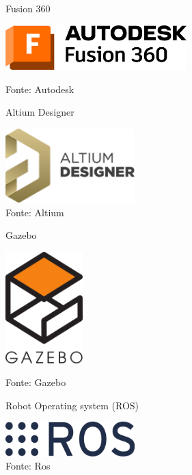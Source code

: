 \documentclass[../poliXuniversity_hospital_(USP)_report.tex]{subfiles}
\begin{document}
\begin{figure}[h]
\centering
    \begin{minipage}{0.5\textwidth}
        \centering
        \caption{Fusion 360}
        \centering %
        \includegraphics[width=7cm]{images/logo_fusion.png}
        \caption*{Fonte: Autodesk}
        \label{figura: Fusion 360}
        
    \end{minipage}\hfill
    \begin{minipage}{0.5\textwidth}
    
        \centering
        \caption{Altium Designer}
        \centering %
        \includegraphics[width=5cm]{images/logo_altium.png}
        \caption*{Fonte: Altium}
        \label{figura:Altium Designer}
        
    \end{minipage}\hfill
\end{figure}

\begin{figure}[h]
\centering
    \begin{minipage}{0.5\textwidth}
        \centering
        \caption{Gazebo}
        \centering %
        \includegraphics[width=3cm]{images/gazebo.png}
        \caption*{Fonte: Gazebo}
        \label{figura: Gazebo}
        
    \end{minipage}\hfill
    \begin{minipage}{0.5\textwidth}
    
        \centering
        \caption{Robot Operating system (ROS)}
        \centering %
        \includegraphics[width=5cm]{images/logo_ros.png}
        \caption*{Fonte: Ros}
        \label{figura:Altium Designer}
        
    \end{minipage}\hfill
\end{figure}
\end{document}
